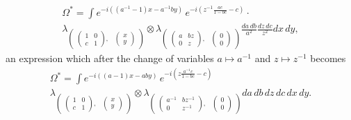 \documentclass[a4paper,11pt,reqno]{amsart}
\numberwithin{equation}{section}
\theoremstyle{remark}
\theoremstyle{definition}
\begin{document}
\begin{multline*}
\Omega^*=\int
e^{-i((a^{-1}-1)x-a^{-1}by)}\,
e^{-i(z^{-1}\frac{ac}{1-bc}-c)}\cdot\\
\lambda_{\begin{pmatrix} \begin{pmatrix}1&0\\c&1\end{pmatrix},&\!\!\!\!\begin{pmatrix}x\\y\end{pmatrix}\end{pmatrix}}
\otimes\lambda_{\begin{pmatrix} \begin{pmatrix}a&bz\\0&z\end{pmatrix},&\!\!\!\!\begin{pmatrix}0\\0\end{pmatrix}\end{pmatrix}}
 \frac{da\,db}{a^2} \frac{dz\,dc}{z^2}dx\,dy,
\end{multline*}
an expression which after the change of variables $a\mapsto a^{-1}$ and $z\mapsto z^{-1}$ becomes
\begin{multline*}
\Omega^*=\int
e^{-i((a-1)x-aby)}\,
e^{-i(z\frac{a^{-1}c}{1-bc}-c)}\\
\lambda_{\begin{pmatrix} \begin{pmatrix}1&0\\c&1\end{pmatrix},&\!\!\!\!\begin{pmatrix}x\\y\end{pmatrix}\end{pmatrix}}
\otimes\lambda_{\begin{pmatrix} \begin{pmatrix}a^{-1}&bz^{-1}\\0&z^{-1}\end{pmatrix},&\!\!\!\!\begin{pmatrix}0\\0\end{pmatrix}\end{pmatrix}}
 da\,db\,dz\,dc\,dx\,dy.
\end{multline*}
\end{document}
